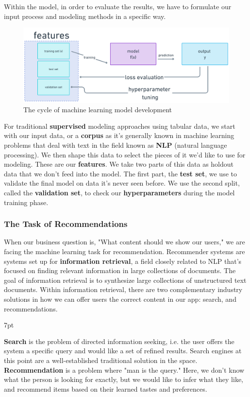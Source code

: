 \documentclass[11pt, table]{diazessay} %
\newenvironment{formal}{%
  \def\FrameCommand{%
    \hspace{1pt}%
    {\color{w_lightblue}\vrule width 2pt}%
    {\color{formalshade}\vrule width 4pt}%
    \colorbox{formalshade}%
  }%
  \MakeFramed{\advance\hsize-\width\FrameRestore}%
  \noindent\hspace{-4.55pt}%
  \begin{adjustwidth}{}{7pt}%
  \vspace{2pt}\vspace{2pt}%
}
{%
  \vspace{2pt}\end{adjustwidth}\endMakeFramed%
}
\begin{document}
\begin{sloppypar}
Within the model, in order to evaluate the results, we have to formulate our input process and modeling methods in a specific way. 

\begin{figure}[H]
  \includegraphics[width=\linewidth]{figures/model_cycle.png}
  \caption{The cycle of machine learning model development}
\end{figure}

For traditional \textbf{supervised} modeling approaches using tabular data, we start with our input data, or a \textbf{corpus} as it's generally known in machine learning problems that deal with text in the field known as \textbf{NLP} (natural language processing). We then shape this data to select the pieces of it we'd like to use for modeling. These are our \textbf{features}.  We take two parts of this data as holdout data that we don't feed into the model. The first part, the \textbf{test set}, we use to validate the final model on data it's never seen before. We use the second split, called the \textbf{validation set}, to check our \textbf{hyperparameters} during the model training phase. 

\subsubsection{The Task of Recommendations}

When our business question is, "What content should we show our users," we are facing the machine learning task for recommendation. Recommender systems are systems set up for \textbf{information retrieval}, a field closely related to NLP that's focused on finding relevant information in large collections of documents.   The goal of information retrieval is to synthesize large collections of unstructured text documents. Within information retrieval, there are two complementary industry solutions in how we can offer users the correct content in our app: search, and recommendations. 

\begin{formal}
\textbf{Search} is the problem of directed\citep{ekstrand2019recommender} information seeking, i.e. the user offers the system a specific query and would like a set of refined results. Search engines at this point are a well-established traditional solution in the space. \textbf{Recommendation} is a problem where "man is the query."\citep{seaver2022computing}  Here, we don't know what the person is looking for exactly, but we would like to infer what they like, and recommend items based on their learned tastes and preferences. 
\end{formal}


\end{sloppypar}
\end{document}
